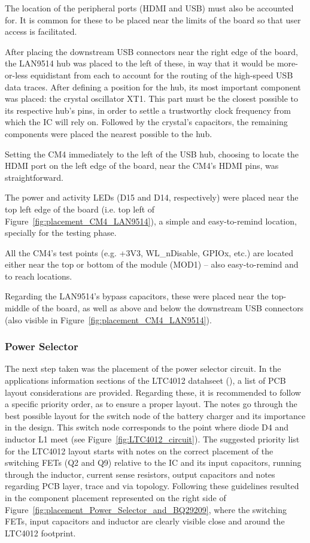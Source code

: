 The location of the peripheral ports (HDMI and USB) must also be accounted for. It is common for these to be placed near the limits of the board so that user access is facilitated.

After placing the downstream USB connectors near the right edge of the board, the LAN9514 hub was placed to the left of these, in way that it would be more-or-less equidistant from each to account for the routing of the high-speed USB data traces. After defining a position for the hub, its most important component was placed: the crystal oscillator XT1. This part must be the closest possible to its respective hub's pins, in order to settle a trustworthy clock frequency from which the IC will rely on. Followed by the crystal's capacitors, the remaining components were placed the nearest possible to the hub.

Setting the CM4 immediately to the left of the USB hub, choosing to locate the HDMI port on the left edge of the board, near the CM4's HDMI pins, was straightforward.

The power and activity LEDs (D15 and D14, respectively) were placed near the top left edge of the board (i.e. top left of Figure~\ref{fig:placement_CM4_LAN9514}), a simple and easy-to-remind location, specially for the testing phase.

All the CM4's test points (e.g. +3V3, WL\_nDisable, GPIOx, etc.) are located either near the top or bottom of the module (MOD1) -- also easy-to-remind and to reach locations.

Regarding the LAN9514's bypass capacitors, these were placed near the top-middle of the board, as well as above and below the downstream USB connectors (also visible in Figure~\ref{fig:placement_CM4_LAN9514}).


\subsubsection{Power Selector}\label{sec:5112_LAN9514}

The next step taken was the placement of the power selector circuit. In the applications information sections of the LTC4012 datahseet (\cite{LTC4012}), a list of PCB layout considerations are provided. Regarding these, it is recommended to follow a specific priority order, as to ensure a proper layout. The notes go through the best possible layout for the switch node of the battery charger and its importance in the design. This switch node corresponds to the point where diode D4 and inductor L1 meet (see Figure~\ref{fig:LTC4012_circuit}). The suggested priority list for the LTC4012 layout starts with notes on the correct placement of the switching FETs (Q2 and Q9) relative to the IC and its input capacitors, running through the inductor, current sense resistors, output capacitors and notes regarding PCB layer, trace and via topology. Following these guidelines resulted in the component placement represented on the right side of Figure~\ref{fig:placement_Power_Selector_and_BQ29209}, where the switching FETs, input capacitors and inductor are clearly visible close and around the LTC4012 footprint.

